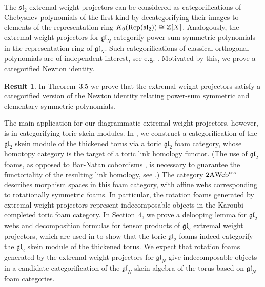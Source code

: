 \documentclass[11pt]{article}
\theoremstyle{definition}
\newtheorem{result}[theo]{Result}
\numberwithin{equation}{section}
\newcommand{\slnn}[1]{\mf{sl}_{#1}}
\newcommand{\glnn}[1]{\mf{gl}_{#1}}
\def\mf{\mathfrak}
\def\Z{{\mathbb Z}}
\newcommand{\reptwo}{\Rep(\slnn{2})}
\newcommand{\Rep}{\cat{Rep}}
\newcommand{\cat}[1]{\ensuremath{\mbox{\bfseries {\upshape {#1}}}}}
\newcommand{\AWeb}[1][]{#1\cat{A}\cat{Web}}
\newcommand{\essAWeb}[1][]{#1\AWeb^{\mathrm{ess}}}
\begin{document}
The $\slnn{2}$ extremal weight projectors can be considered as categorifications
of Chebyshev polynomials of the first kind by decategorifying their images to
elements of the representation ring $K_0(\reptwo)\cong \Z[X]$. Analogously, the
extremal weight projectors for $\glnn{N}$ categorify power-sum symmetric
polynomials in the representation ring of $\glnn{N}$. Such categorifications of
classical orthogonal polynomials are of independent interest, see e.g.
\cite{KSa}. Motivated by this, we prove a categorified Newton identity.

\begin{result} In Theorem~3.5 we prove that the extremal weight
projectors satisfy a categorified version of the Newton identity relating
power-sum symmetric and elementary symmetric polynomials.
\end{result} 

The main application for our diagrammatic extremal weight projectors, however,
is in categorifying toric skein modules. In \cite{QW3}, we construct a
categorification of the $\glnn{2}$ skein module of the thickened torus via a
toric $\glnn{2}$ foam category, whose homotopy category is the target of a toric
link homology functor. (The use of $\glnn{2}$ foams, as opposed to Bar-Natan
cobordisms \cite{BN2}, is necessary to guarantee the functoriality of the
resulting link homology, see \cite{Blan, ETW}.) The category $\essAWeb[2]$
describes morphism spaces in this foam category, with affine webs corresponding
to rotationally symmetric foams. In particular, the rotation foams generated by
extremal weight projectors represent indecomposable objects in the Karoubi
completed toric foam category. In Section~4, we prove a delooping
lemma for $\glnn{2}$ webs and decomposition formulas for tensor products of
$\glnn{2}$ extremal weight projectors, which are used in \cite{QW3} to show that
the toric $\glnn{2}$ foams indeed categorify the $\glnn{2}$ skein module of the
thickened torus. We expect that rotation foams generated by the extremal weight
projectors for $\glnn{N}$ give indecomposable objects in a candidate
categorification of the $\glnn{N}$ skein algebra of the torus based on
$\glnn{N}$ foam categories. 
\end{document}

